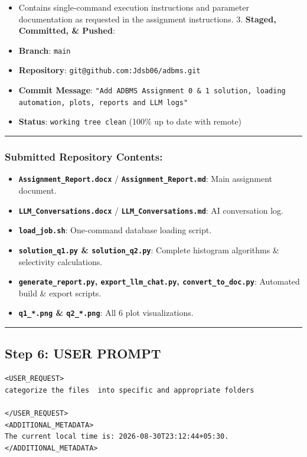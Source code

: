 \documentclass[11pt,a4paper]{article}
\begin{document}
{\begin{itemize}
\item Contains single-command execution instructions and parameter documentation as requested in the assignment instructions.
3. \textbf{Staged, Committed, \& Pushed}:

\item \textbf{Branch}: \texttt{main}
\item \textbf{Repository}: \texttt{git@github.com:Jdsb06/adbms.git}
\item \textbf{Commit Message}: \texttt{"Add ADBMS Assignment 0 \& 1 solution, loading automation, plots, reports and LLM logs"}
\item \textbf{Status}: \texttt{working tree clean} (100\% up to date with remote)
\end{itemize}

\hrule


\subsubsection{Submitted Repository Contents:}
\begin{itemize}
\item \textbf{\texttt{Assignment\_Report.docx}} / \textbf{\texttt{Assignment\_Report.md}}: Main assignment document.
\item \textbf{\texttt{LLM\_Conversations.docx}} / \textbf{\texttt{LLM\_Conversations.md}}: AI conversation log.
\item \textbf{\texttt{load\_job.sh}}: One-command database loading script.
\item \textbf{\texttt{solution\_q1.py} \& \texttt{solution\_q2.py}}: Complete histogram algorithms \& selectivity calculations.
\item \textbf{\texttt{generate\_report.py}, \texttt{export\_llm\_chat.py}, \texttt{convert\_to\_doc.py}}: Automated build \& export scripts.
\item \textbf{\texttt{q1\_*.png} \& \texttt{q2\_*.png}}: All 6 plot visualizations.
\end{itemize}

\hrule

\subsection{Step 6: USER PROMPT}

\begin{lstlisting}[language=text]
<USER_REQUEST>
categorize the files  into specific and appropriate folders 

</USER_REQUEST>
<ADDITIONAL_METADATA>
The current local time is: 2026-08-30T23:12:44+05:30.
</ADDITIONAL_METADATA>
\end{lstlisting}


}
\end{document}
